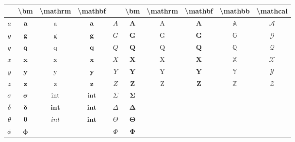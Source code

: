 \begin{table}[h]
    \centering
    \addtolength{\tabcolsep}{-2pt}
    \small    
    \begin{tabular}{cccc|cccccc}
         & \textbackslash bm &  \textbackslash mathrm & \textbackslash mathbf & 
         & \textbackslash bm &  \textbackslash mathrm & \textbackslash mathbf & \textbackslash mathbb & \textbackslash mathcal \\
        \hline
        $a$ & $\bm{a}$ & $\mathrm{a}$ & $\mathbf{a}$ &  
        $A$ & $\bm{A}$ & $\mathrm{A}$ & $\mathbf{A}$ & $\mathbb{A}$ & $\mathcal{A}$ \\
        $g$ & $\bm{g}$ & $\mathrm{g}$ & $\mathbf{g}$ &  
        $G$ & $\bm{G}$ & $\mathrm{G}$ & $\mathbf{G}$ & $\mathbb{G}$ & $\mathcal{G}$ \\
        $q$ & $\bm{q}$ & $\mathrm{q}$ & $\mathbf{q}$ & 
        $Q$ & $\bm{Q}$ & $\mathrm{Q}$ & $\mathbf{Q}$ & $\mathbb{Q}$ & $\mathcal{Q}$ \\
        $x$ & $\bm{x}$ & $\mathrm{x}$ & $\mathbf{x}$ & 
        $X$ & $\bm{X}$ & $\mathrm{X}$ & $\mathbf{X}$ & $\mathbb{X}$ & $\mathcal{X}$ \\
        $y$ & $\bm{y}$ & $\mathrm{y}$ & $\mathbf{y}$ & 
        $Y$ & $\bm{Y}$ & $\mathrm{Y}$ & $\mathbf{Y}$ & $\mathbb{Y}$ & $\mathcal{Y}$ \\
        $z$ & $\bm{z}$ & $\mathrm{z}$ & $\mathbf{z}$ & 
        $Z$ & $\bm{Z}$ & $\mathrm{Z}$ & $\mathbf{Z}$ & $\mathbb{Z}$ & $\mathcal{Z}$ \\        
        \hline
		$\sigma$ & $\bm{\sigma}$ & $\mathrm{int}$ & $\text{int}$ &
		$\Sigma$ & $\bm{\Sigma}$ & & & & \\
		$\delta$ & $\bm{\delta}$ & $\mathbf{int}$ & $\textbf{int}$ & 
		$\Delta$ & $\bm{\Delta}$ & & & & \\
		$\theta$ & $\bm{\theta}$ & $int$ & $\bm{int}$ & 
		$\Theta$ & $\bm{\Theta}$ & & & & \\
		$\phi$ & $\bm{\phi}$ & & & 
		$\Phi$ & $\bm{\Phi}$ & & & & \\
    \end{tabular}
\end{table}
